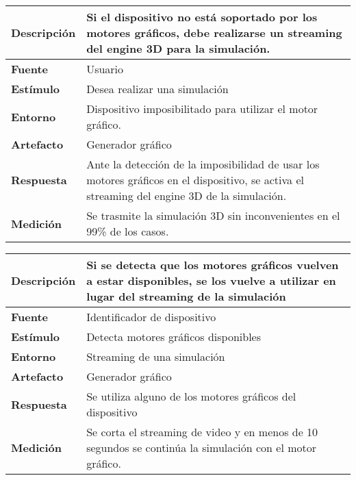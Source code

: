 \begin{center}
  \begin{tabular}{| l | p{10cm} | }
    \hline
	\textbf{Descripción} & Si el dispositivo no está soportado por los motores gráficos, debe realizarse un streaming del engine 3D para la simulación. \\  \hline
	\textbf{Fuente} & Usuario \\  \hline
	\textbf{Estímulo} & Desea realizar una simulación\\  \hline
	\textbf{Entorno} & Dispositivo imposibilitado para utilizar el motor gráfico.\\  \hline
	\textbf{Artefacto} & Generador gráfico\\  \hline
	\textbf{Respuesta} & Ante la detección de la imposibilidad de usar los motores gráficos en el dispositivo, se activa el streaming del engine 3D de la simulación.\\  \hline
	\textbf{Medición} & Se trasmite la simulación 3D sin inconvenientes en el 99\% de los casos.\\  \hline
  \end{tabular}
\end{center}  

\begin{center}
  \begin{tabular}{| l | p{10cm} | }
    \hline
	\textbf{Descripción} & Si se detecta que los motores gráficos vuelven a estar disponibles, se los vuelve a utilizar en lugar del streaming de la simulación \\  \hline
	\textbf{Fuente} & Identificador de dispositivo\\  \hline
	\textbf{Estímulo} & Detecta motores gráficos disponibles\\  \hline
	\textbf{Entorno} & Streaming de una simulación\\  \hline
	\textbf{Artefacto} & Generador gráfico\\  \hline
	\textbf{Respuesta} & Se utiliza alguno de los motores gráficos del dispositivo\\  \hline
	\textbf{Medición} & Se corta el streaming de video y en menos de 10 segundos se continúa la simulación con el motor gráfico.\\  \hline
  \end{tabular}
\end{center}  

